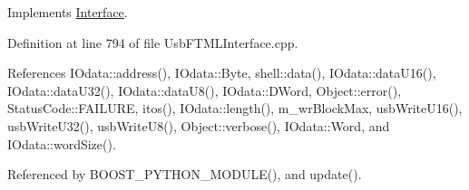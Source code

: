 Implements \hyperlink{classInterface_ad665cacbaf490a26c1c4ba192022e68a}{Interface}.



Definition at line 794 of file Usb\+F\+T\+M\+L\+Interface.\+cpp.



References I\+Odata\+::address(), I\+Odata\+::\+Byte, shell\+::data(), I\+Odata\+::data\+U16(), I\+Odata\+::data\+U32(), I\+Odata\+::data\+U8(), I\+Odata\+::\+D\+Word, Object\+::error(), Status\+Code\+::\+F\+A\+I\+L\+U\+RE, itos(), I\+Odata\+::length(), m\+\_\+wr\+Block\+Max, usb\+Write\+U16(), usb\+Write\+U32(), usb\+Write\+U8(), Object\+::verbose(), I\+Odata\+::\+Word, and I\+Odata\+::word\+Size().



Referenced by B\+O\+O\+S\+T\+\_\+\+P\+Y\+T\+H\+O\+N\+\_\+\+M\+O\+D\+U\+L\+E(), and update().


